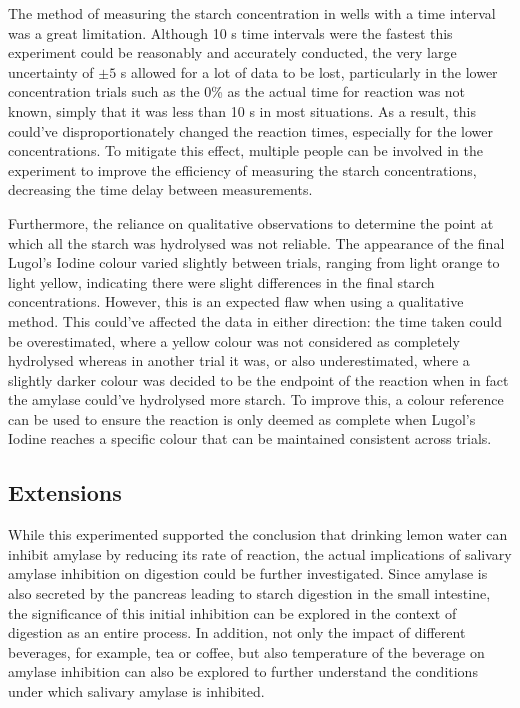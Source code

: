 \documentclass[12pt]{article}
\begin{document}
The method of measuring the starch concentration in wells with a time interval was a great limitation. Although 10 s time intervals were the fastest this experiment could be reasonably and accurately conducted, the very large uncertainty of $\pm 5$ s allowed for a lot of data to be lost, particularly in the lower concentration trials such as the 0\% as the actual time for reaction was not known, simply that it was less than 10 s in most situations. As a result, this could've disproportionately changed the reaction times, especially for the lower concentrations. To mitigate this effect, multiple people can be involved in the experiment to improve the efficiency of measuring the starch concentrations, decreasing the time delay between measurements.

Furthermore, the reliance on qualitative observations to determine the point at which all the starch was hydrolysed was not reliable. The appearance of the final Lugol's Iodine colour varied slightly between trials, ranging from light orange to light yellow, indicating there were slight differences in the final starch concentrations. However, this is an expected flaw when using a qualitative method. This could've affected the data in either direction: the time taken could be overestimated, where a yellow colour was not considered as completely hydrolysed whereas in another trial it was, or also underestimated, where a slightly darker colour was decided to be the endpoint of the reaction when in fact the amylase could've hydrolysed more starch. To improve this, a colour reference can be used to ensure the reaction is only deemed as complete when Lugol's Iodine reaches a specific colour that can be maintained consistent across trials.

\subsection{Extensions}

While this experimented supported the conclusion that drinking lemon water can inhibit amylase by reducing its rate of reaction, the actual implications of salivary amylase inhibition on digestion could be further investigated. Since amylase is also secreted by the pancreas leading to starch digestion in the small intestine, the significance of this initial inhibition can be explored in the context of digestion as an entire process. In addition, not only the impact of different beverages, for example, tea or coffee, but also temperature of the beverage on amylase inhibition can also be explored to further understand the conditions under which salivary amylase is inhibited. 


\pagebreak

\printbibliography
\end{document}
